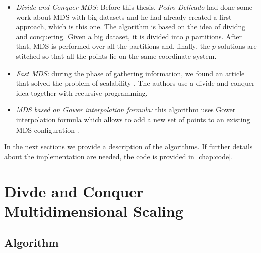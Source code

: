\documentclass[11pt]{report}
\begin{document}
\begin{itemize}
\item \textit{Divide and Conquer MDS:} Before this thesis, 
\textit{Pedro Delicado} had done some work about  MDS with big
datasets and he had already created a first approach, which is this one. The 
algorithm is based on the idea of dividng and conquering. Given a big dataset, 
it is divided into $p$ partitions. After that, MDS is performed over all the 
partitions and, finally, the $p$ solutions are stitched so that all the points 
lie on the same coordinate system.

\item \textit{Fast MDS:} during the phase of gathering information, we found an 
article that solved the problem of scalability \cite{Yang06afast}. The 
authors  use a divide and conquer idea together with recursive programming. 

\item \textit{MDS based on Gower interpolation formula:} this algorithm uses
Gower interpolation formula which allows to add a new set of points
to an existing MDS configuration \cite{gowerformula}. 

\end{itemize}

In the next sections we provide a description of the algorithms. 
If further details about the implementation are needed, the code is provided in 
\autoref{chap:code}.

\section{Divde and Conquer Multidimensional Scaling}
\subsection{Algorithm}
\end{document}
